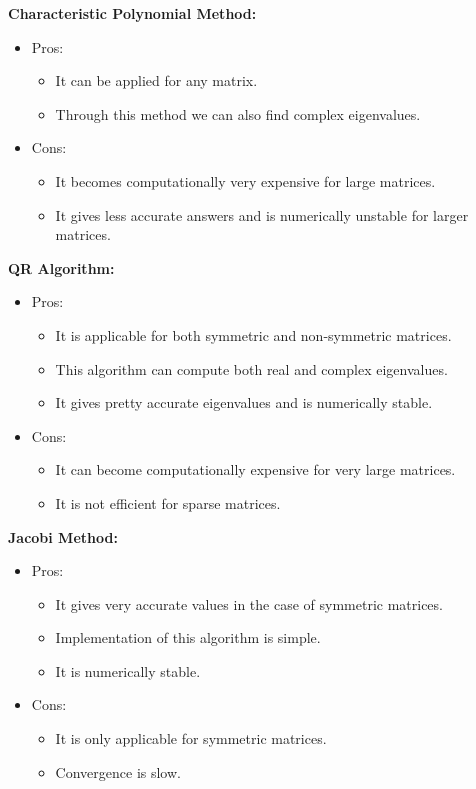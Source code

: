 \documentclass[a4paper, 14pt]{article}
\begin{document}
\textbf{Characteristic Polynomial Method:}
\begin{itemize}
    \item Pros:
    \begin{itemize}
        \item It can be applied for any matrix.
        \item Through this method we can also find complex eigenvalues.
    \end{itemize}
    \item Cons:
    \begin{itemize}
        \item It becomes computationally very expensive for large matrices.
        \item It gives less accurate answers and is numerically unstable for larger matrices.
    \end{itemize}
\end{itemize}

\textbf{QR Algorithm:}
\begin{itemize}
    \item Pros:
    \begin{itemize}
        \item It is applicable for both symmetric and non-symmetric matrices.
        \item This algorithm can compute both real and complex eigenvalues.
        \item It gives pretty accurate eigenvalues and is numerically stable.
    \end{itemize}
    \item Cons:
    \begin{itemize}
        \item It can become computationally expensive for very large matrices.
        \item It is not efficient for sparse matrices.
    \end{itemize}
\end{itemize}

\textbf{Jacobi Method:}
\begin{itemize}
    \item Pros:
    \begin{itemize}
        \item It gives very accurate values in the case of symmetric matrices.
        \item Implementation of this algorithm is simple.
        \item It is numerically stable.
    \end{itemize}
    \item Cons:
    \begin{itemize}
        \item It is only applicable for symmetric matrices.
        \item Convergence is slow.
    \end{itemize}
\end{itemize}
\end{document}
